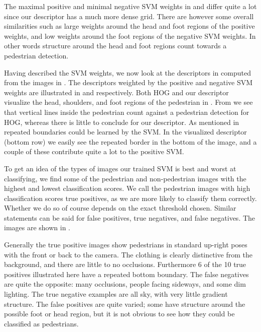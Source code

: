 \documentclass[thesis.tex]{subfiles}
\begin{document}
The maximal positive and minimal negative SVM weights in  and  differ quite a lot since our descriptor has a much more dense grid. There are however some overall similarities such as large weights around the head and foot regions of the positive weights, and low weights around the foot regions of the negative SVM weights. In other words structure around the head and foot regions count towards a pedestrian detection.

Having described the SVM weights, we now look at the descriptors in  computed from the images in . The descriptors weighted by the positive and negative SVM weights are illustrated in  and  respectively. Both HOG and our descriptor visualize the head, shoulders, and foot regions of the pedestrian in . From  we see that vertical lines inside the pedestrian count against a pedestrian detection for HOG, whereas there is little to conclude for our descriptor. As mentioned in  repeated boundaries could be learned by the SVM. In the visualized descriptor (bottom row) we easily see the repeated border in the bottom of the image, and a couple of these contribute quite a lot to the positive SVM.

To get an idea of the types of images our trained SVM is best and worst at classifying, we find some of the pedestrian and non-pedestrian images with the highest and lowest classification scores. We call the pedestrian images with high classification scores true positives, as we are more likely to classify them correctly. Whether we do so of course depends on the exact threshold chosen. Similar statements can be said for false positives, true negatives, and false negatives. The images are shown in .

Generally the true positive images show pedestrians in standard up-right poses with the front or back to the camera. The clothing is clearly distinctive from the background, and there are little to no occlusions. Furthermore 6 of the 10 true positives illustrated here have a repeated bottom boundary. The false negatives are quite the opposite: many occlusions, people facing sideways, and some dim lighting. The true negative examples are all sky, with very little gradient structure. The false positives are quite varied; some have structure around the possible foot or head region, but it is not obvious to see how they could be classified as pedestrians.
%
\end{document}
